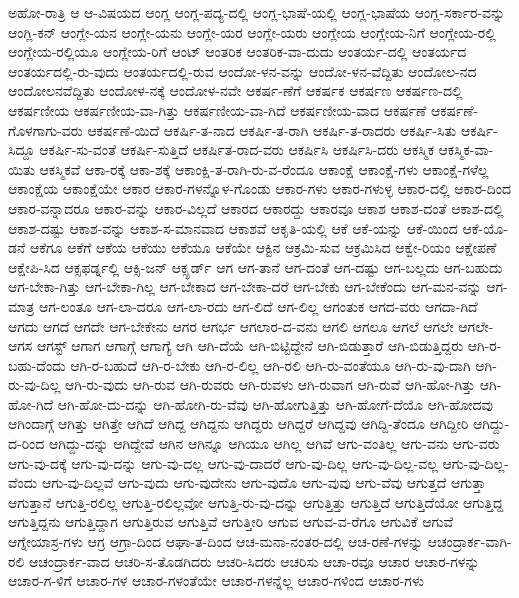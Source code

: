 {ಅಹೋ-ರಾತ್ರಿ
ಆ
ಆ-ವಿಷಯದ
ಆಂಗ್ಲ
ಆಂಗ್ಲ-ಪದ್ಯ-ದಲ್ಲಿ
ಆಂಗ್ಲ-ಭಾಷೆ-ಯಲ್ಲಿ
ಆಂಗ್ಲ-ಭಾಷೆಯ
ಆಂಗ್ಲ-ಸರ್ಕಾರ-ವನ್ನು
ಆಂಗ್ಲಿ-ಕನ್
ಆಂಗ್ಲೇ-ಯನ
ಆಂಗ್ಲೇ-ಯನು
ಆಂಗ್ಲೇ-ಯರ
ಆಂಗ್ಲೇ-ಯರು
ಆಂಗ್ಲೇಯ
ಆಂಗ್ಲೇಯ-ನಿಗೆ
ಆಂಗ್ಲೇಯ-ರಲ್ಲಿ
ಆಂಗ್ಲೇಯ-ರಲ್ಲಿಯೂ
ಆಂಗ್ಲೇಯ-ರಿಗೆ
ಆಂಟ್
ಆಂತರಿಕ
ಆಂತರಿಕ-ವಾ-ದುದು
ಆಂತರ್ಯ-ದಲ್ಲಿ
ಆಂತರ್ಯದ
ಆಂತರ್ಯದಲ್ಲಿ-ರು-ವುದು
ಆಂತರ್ಯದಲ್ಲಿ-ರುವ
ಆಂದೋ-ಳನ-ವನ್ನು
ಆಂದೋ-ಳನ-ವೆದ್ದಿತು
ಆಂದೋಲ-ನದ
ಆಂದೋಲನವೆದ್ದಿತು
ಆಂದೋಳ-ನಕ್ಕೆ
ಆಂದೋಳ-ನವೇ
ಆಕರ್ಷ-ಣೆಗೆ
ಆಕರ್ಷಕ
ಆಕರ್ಷಣ
ಆಕರ್ಷಣ-ದಲ್ಲಿ
ಆಕರ್ಷಣೀಯ
ಆಕರ್ಷಣೀಯ-ವಾ-ಗಿತ್ತು
ಆಕರ್ಷಣೀಯ-ವಾ-ಗಿದೆ
ಆಕರ್ಷಣೀಯ-ವಾದ
ಆಕರ್ಷಣೆ
ಆಕರ್ಷಣೆ-ಗೊಳಗಾಗು-ವರು
ಆಕರ್ಷಣೆ-ಯಿದೆ
ಆಕರ್ಷಿ-ತ-ನಾದ
ಆಕರ್ಷಿ-ತ-ರಾಗಿ
ಆಕರ್ಷಿ-ತ-ರಾದರು
ಆಕರ್ಷಿ-ಸಿತು
ಆಕರ್ಷಿ-ಸಿದ್ದೂ
ಆಕರ್ಷಿ-ಸು-ವಂತೆ
ಆಕರ್ಷಿ-ಸುತ್ತಿದೆ
ಆಕರ್ಷಿತ-ರಾದ-ವರು
ಆಕರ್ಷಿಸಿ
ಆಕರ್ಷಿಸಿ-ದರು
ಆಕಸ್ಮಿಕ
ಆಕಸ್ಮಿಕ-ವಾ-ಯಿತು
ಆಕಸ್ಮಿಕವೆ
ಆಕಾ-ರಕ್ಕೆ
ಆಕಾ-ಶಕ್ಕೆ
ಆಕಾಂಕ್ಷಿ-ತ-ರಾಗಿ-ರು-ವ-ರೆಂದೂ
ಆಕಾಂಕ್ಷೆ
ಆಕಾಂಕ್ಷೆ-ಗಳು
ಆಕಾಂಕ್ಷೆ-ಗಳೆಲ್ಲ
ಆಕಾಂಕ್ಷೆಯ
ಆಕಾಂಕ್ಷೆಯೇ
ಆಕಾರ
ಆಕಾರ-ಗಳನ್ನೊಳ-ಗೊಂಡು
ಆಕಾರ-ಗಳು
ಆಕಾರ-ಗಳುಳ್ಳ
ಆಕಾರ-ದಲ್ಲಿ
ಆಕಾರ-ದಿಂದ
ಆಕಾರ-ವನ್ನಾದರೂ
ಆಕಾರ-ವನ್ನು
ಆಕಾರ-ವಿಲ್ಲದೆ
ಆಕಾರದ
ಆಕಾರದ್ದು
ಆಕಾರವೂ
ಆಕಾಶ
ಆಕಾಶ-ದಂತೆ
ಆಕಾಶ-ದಲ್ಲಿ
ಆಕಾಶ-ದಷ್ಟು
ಆಕಾಶ-ವನ್ನು
ಆಕಾಶ-ಸ-ಮಾನವಾದ
ಆಕಾಶವೆ
ಆಕೃತಿ-ಯಲ್ಲಿ
ಆಕೆ
ಆಕೆ-ಯನ್ನು
ಆಕೆ-ಯಿಂದ
ಆಕೆ-ಯೊ-ಡನೆ
ಆಕೆಗೂ
ಆಕೆಗೆ
ಆಕೆಯ
ಆಕೆಯು
ಆಕೆಯೂ
ಆಕೆಯೇ
ಆಕ್ಟಿನ
ಆಕ್ರಮಿ-ಸುವ
ಆಕ್ರಮಿಸಿದ
ಆಕ್ವೇ-ರಿಯಂ
ಆಕ್ಷೇಪಣೆ
ಆಕ್ಷೇಪಿ-ಸಿದ
ಆಕ್ಸಫರ್ಡ್ನಲ್ಲಿ
ಆಕ್ಸಿ-ಜನ್
ಆಕ್ಸ್ಫರ್ಡ್
ಆಗ
ಆಗ-ತಾನೆ
ಆಗ-ದಂತೆ
ಆಗ-ದಷ್ಟು
ಆಗ-ಬಲ್ಲದು
ಆಗ-ಬಹುದು
ಆಗ-ಬೇಕಾ-ಗಿತ್ತು
ಆಗ-ಬೇಕಾ-ಗಿಲ್ಲ
ಆಗ-ಬೇಕಾದ
ಆಗ-ಬೇಕಾ-ದರೆ
ಆಗ-ಬೇಕು
ಆಗ-ಬೇಕೆಂದು
ಆಗ-ಮನ-ವನ್ನು
ಆಗ-ಮಾತ್ರ
ಆಗ-ಲಂತೂ
ಆಗ-ಲಾ-ದರೂ
ಆಗ-ಲಾ-ರದು
ಆಗ-ಲಿದೆ
ಆಗ-ಲಿಲ್ಲ
ಆಗಂತುಕ
ಆಗದ-ವರು
ಆಗದಾ-ಗಿದೆ
ಆಗದು
ಆಗದೆ
ಆಗದೇ
ಆಗ-ಬೇಕೇನು
ಆಗರ
ಆಗರ್ಭ
ಆಗಲಾರ-ದ-ವನು
ಆಗಲಿ
ಆಗಲೂ
ಆಗಲೆ
ಆಗಲೇ
ಆಗಲೇ-
ಆಗಸ
ಆಗಸ್ಟ್
ಆಗಾಗ
ಆಗಾಗ್ಗೆ
ಆಗಾಗ್ಯೆ
ಆಗಿ
ಆಗಿ-ದೆಯೆ
ಆಗಿ-ಬಿಟ್ಟಿದ್ದೇನೆ
ಆಗಿ-ಬಿಡುತ್ತಾರೆ
ಆಗಿ-ಬಿಡುತ್ತಿದ್ದರು
ಆಗಿ-ರ-ಬಹು-ದೆಂದು
ಆಗಿ-ರ-ಬಹುದೆ
ಆಗಿ-ರ-ಬೇಕು
ಆಗಿ-ರ-ಲಿಲ್ಲ
ಆಗಿ-ರಲಿ
ಆಗಿ-ರು-ವಂತೆಯೂ
ಆಗಿ-ರು-ವು-ದಾಗಿ
ಆಗಿ-ರು-ವು-ದಿಲ್ಲ
ಆಗಿ-ರು-ವುದು
ಆಗಿ-ರುವ
ಆಗಿ-ರುವರು
ಆಗಿ-ರುವಳು
ಆಗಿ-ರುವಾಗ
ಆಗಿ-ರುವೆ
ಆಗಿ-ಹೋ-ಗಿತ್ತು
ಆಗಿ-ಹೋ-ಗಿದೆ
ಆಗಿ-ಹೋ-ದು-ದನ್ನು
ಆಗಿ-ಹೋಗಿ-ರು-ವೆವು
ಆಗಿ-ಹೋಗುತ್ತಿತ್ತು
ಆಗಿ-ಹೋಗೆ-ದೆಯೊ
ಆಗಿ-ಹೋದವು
ಆಗಿಂದಾಗ್ಗೆ
ಆಗಿತ್ತು
ಆಗಿತ್ತೇ
ಆಗಿದೆ
ಆಗಿದ್ದ
ಆಗಿದ್ದನು
ಆಗಿದ್ದರು
ಆಗಿದ್ದರೆ
ಆಗಿದ್ದವು
ಆಗಿದ್ದಿ-ತೆಂದೂ
ಆಗಿದ್ದೀರಿ
ಆಗಿದ್ದು-ದ-ರಿಂದ
ಆಗಿದ್ದು-ದನ್ನು
ಆಗಿದ್ದೇವೆ
ಆಗಿನ
ಆಗಿನ್ನೂ
ಆಗಿಯೂ
ಆಗಿಲ್ಲ
ಆಗಿವೆ
ಆಗು-ವಂತಿಲ್ಲ
ಆಗು-ವನು
ಆಗು-ವರು
ಆಗು-ವು-ದಕ್ಕೆ
ಆಗು-ವು-ದನ್ನು
ಆಗು-ವು-ದಲ್ಲ
ಆಗು-ವು-ದಾದರೆ
ಆಗು-ವು-ದಿಲ್ಲ
ಆಗು-ವು-ದಿಲ್ಲ-ವಲ್ಲ
ಆಗು-ವು-ದಿಲ್ಲ-ವೆಂದು
ಆಗು-ವು-ದಿಲ್ಲವೆ
ಆಗು-ವುದು
ಆಗು-ವುದೇನು
ಆಗು-ವುದೊ
ಆಗು-ವುವು
ಆಗು-ವೆವು
ಆಗುತ್ತದೆ
ಆಗುತ್ತಾ
ಆಗುತ್ತಾನೆ
ಆಗುತ್ತಿ-ರಲಿಲ್ಲ
ಆಗುತ್ತಿ-ರಲಿಲ್ಲವೋ
ಆಗುತ್ತಿ-ರು-ವು-ದನ್ನು
ಆಗುತ್ತಿತ್ತು
ಆಗುತ್ತಿದೆ
ಆಗುತ್ತಿದೆಯೋ
ಆಗುತ್ತಿದ್ದ
ಆಗುತ್ತಿದ್ದನು
ಆಗುತ್ತಿದ್ದಾಗ
ಆಗುತ್ತಿರುವ
ಆಗುತ್ತಿವೆ
ಆಗುತ್ತೀರಿ
ಆಗುವ
ಆಗುವ-ವ-ರೆಗೂ
ಆಗುವಿಕೆ
ಆಗುವೆ
ಆಗ್ನೇಯಾಸ್ರ-ಗಳು
ಆಗ್ರ
ಆಗ್ರಾ-ದಿಂದ
ಆಘಾ-ತ-ದಿಂದ
ಆಚ-ಮನಾ-ನಂತರ-ದಲ್ಲಿ
ಆಚ-ರಣೆ-ಗಳನ್ನು
ಆಚಂದ್ರಾರ್ಕ-ವಾಗಿ-ರಲಿ
ಆಚಂದ್ರಾರ್ಕ-ವಾದ
ಆಚರಿ-ಸ-ತೊಡಗಿದರು
ಆಚರಿ-ಸಿದರು
ಆಚರಿಸು
ಆಚಾ-ರವೂ
ಆಚಾರ
ಆಚಾರ-ಗಳನ್ನು
ಆಚಾರ-ಗ-ಳಿಗೆ
ಆಚಾರ-ಗಳ
ಆಚಾರ-ಗಳಂತೆಯೇ
ಆಚಾರ-ಗಳನ್ನೆಲ್ಲ
ಆಚಾರ-ಗಳಿಂದ
ಆಚಾರ-ಗಳು
}
